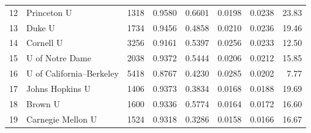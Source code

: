 \documentclass[12pt]{article}
\numberwithin{equation}{subsection}
\theoremstyle{definition}
\begin{document}
\begin{table}[]
\begin{tabular}{r|lrrrrrr}
12            & Princeton U                           & 1318            & 0.9580                                                          & 0.6601         & 0.0198              & 0.0238                                                                   & 23.83                                                                    \\
13            & Duke U                                & 1734            & 0.9456                                                         & 0.4858         & 0.0210              & 0.0236                                                                   & 19.46                                                                    \\
14            & Cornell U                             & 3256            & 0.9161                                                         & 0.5397         & 0.0256              & 0.0233                                                                   & 12.50                                                                    \\
15            & U of Notre Dame                       & 2038            & 0.9372                                                         & 0.5444         & 0.0206              & 0.0212                                                                   & 15.85                                                                    \\
16            & U of California--Berkeley              & 5418            & 0.8767                                                         & 0.4230          & 0.0285              & 0.0202                                                                   & 7.77                                                                     \\
17            & Johns Hopkins U                       & 1406            & 0.9373                                                         & 0.3834         & 0.0168              & 0.0188                                                                   & 19.69                                                                    \\
18            & Brown U                               & 1600            & 0.9336                                                         & 0.5774         & 0.0164              & 0.0172                                                                   & 16.60                                                                    \\
19            & Carnegie Mellon U                     & 1524            & 0.9318                                                         & 0.3286         & 0.0158              & 0.0166                                                                   & 16.67                                                                    \\

\end{tabular}
\end{table}
\end{document}
